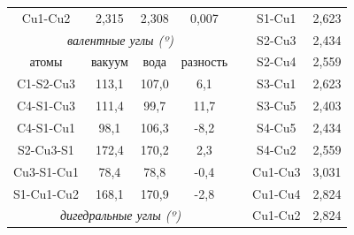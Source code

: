 \documentclass[a4paper,12pt]{article}
\begin{document}
\begin{onehalfspace}
\begin{table}[H]
\begin{tabular}{|cccc|ccc}
			\multicolumn{1}{|c|}{Cu1-Cu2}        & \multicolumn{1}{c|}{2,315}  & \multicolumn{1}{c|}{2,308}  & 0,007    & \multicolumn{1}{c|}{} & \multicolumn{1}{c|}{S1-Cu1}  & \multicolumn{1}{c|}{2,623}                     \\ \cline{1-4} \cline{6-7} 
			\multicolumn{4}{|c|}{\textit{валентные углы (º)}}                                                           & \multicolumn{1}{c|}{} & \multicolumn{1}{c|}{S2-Cu3}  & \multicolumn{1}{c|}{2,434}                     \\ \cline{1-4} \cline{6-7} 
			\multicolumn{1}{|c|}{атомы}          & \multicolumn{1}{c|}{вакуум} & \multicolumn{1}{c|}{вода}   & разность & \multicolumn{1}{c|}{} & \multicolumn{1}{c|}{S2-Cu4}  & \multicolumn{1}{c|}{2,559}                     \\ \cline{1-4} \cline{6-7} 
			\multicolumn{1}{|c|}{C1-S2-Cu3}      & \multicolumn{1}{c|}{113,1}  & \multicolumn{1}{c|}{107,0}  & 6,1      & \multicolumn{1}{c|}{} & \multicolumn{1}{c|}{S3-Cu1}  & \multicolumn{1}{c|}{2,623}                     \\ \cline{1-4} \cline{6-7} 
			\multicolumn{1}{|c|}{C4-S1-Cu3}      & \multicolumn{1}{c|}{111,4}  & \multicolumn{1}{c|}{99,7}   & 11,7     & \multicolumn{1}{c|}{} & \multicolumn{1}{c|}{S3-Cu5}  & \multicolumn{1}{c|}{2,403}                     \\ \cline{1-4} \cline{6-7} 
			\multicolumn{1}{|c|}{C4-S1-Cu1}      & \multicolumn{1}{c|}{98,1}   & \multicolumn{1}{c|}{106,3}  & -8,2     & \multicolumn{1}{c|}{} & \multicolumn{1}{c|}{S4-Cu5}  & \multicolumn{1}{c|}{2,434}                     \\ \cline{1-4} \cline{6-7} 
			\multicolumn{1}{|c|}{S2-Cu3-S1}      & \multicolumn{1}{c|}{172,4}  & \multicolumn{1}{c|}{170,2}  & 2,3      & \multicolumn{1}{c|}{} & \multicolumn{1}{c|}{S4-Cu2}  & \multicolumn{1}{c|}{2,559}                     \\ \cline{1-4} \cline{6-7} 
			\multicolumn{1}{|c|}{Cu3-S1-Cu1}     & \multicolumn{1}{c|}{78,4}   & \multicolumn{1}{c|}{78,8}   & -0,4     & \multicolumn{1}{c|}{} & \multicolumn{1}{c|}{Cu1-Cu3} & \multicolumn{1}{c|}{3,031}                     \\ \cline{1-4} \cline{6-7} 
			\multicolumn{1}{|c|}{S1-Cu1-Cu2}     & \multicolumn{1}{c|}{168,1}  & \multicolumn{1}{c|}{170,9}  & -2,8     & \multicolumn{1}{c|}{} & \multicolumn{1}{c|}{Cu1-Cu4} & \multicolumn{1}{c|}{2,824}                     \\ \cline{1-4} \cline{6-7} 
			\multicolumn{4}{|c|}{\textit{дигедральные углы   (º)}}                                                      & \multicolumn{1}{c|}{} & \multicolumn{1}{c|}{Cu1-Cu2} & \multicolumn{1}{c|}{2,824}                     \\ \cline{1-4} \cline{6-7} 

\end{tabular}
\end{table}
\end{onehalfspace}
\end{document}
